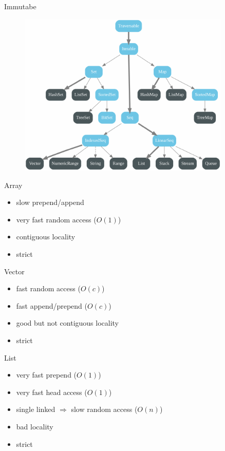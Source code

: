 \documentclass[xcolor=svgnames]{beamer}
\begin{document}
    \begin{frame}[fragile]
    {Immutabe}
        \begin{figure}
            \centering
\includegraphics[width=0.9\textwidth]{collections-immutable-diagram.pdf}
        \end{figure}
    \end{frame}

    \begin{frame}
    {Array}
        \begin{itemize}
            \item slow prepend/append
            \item very fast random access ($O(1)$)
            \item contiguous locality
            \item strict
        \end{itemize}
    \end{frame}

    \begin{frame}
    {Vector}
        \begin{itemize}
            \item fast random access ($O(c)$)
            \item fast append/prepend ($O(c)$)
            \item good but not contiguous locality
            \item strict
        \end{itemize}
    \end{frame}

    \begin{frame}
    {List}
        \begin{itemize}
            \item very fast prepend ($O(1)$)
            \item very fast head access ($O(1)$)
            \item single linked $\Rightarrow$ slow random access ($O(n)$)
            \item bad locality
            \item strict
        \end{itemize}
    \end{frame}
\end{document}
